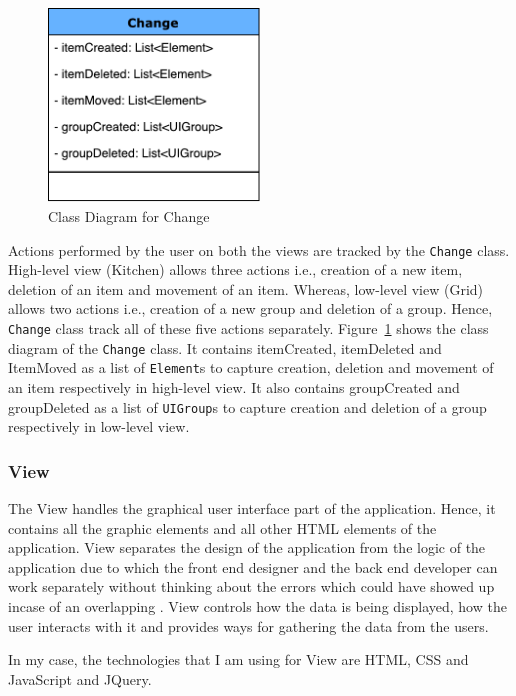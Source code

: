 \begin{figure}
	\includegraphics[width=0.5\textwidth]{figures/ClassDia_Change}
	\caption{Class Diagram for Change}
	\label{fig:ClassDia_Change}
\end{figure}

Actions performed by the user on both the views are tracked by the \texttt{Change} class. High-level view (Kitchen) allows three actions i.e., creation of a new item, deletion of an item and movement of an item. Whereas, low-level view (Grid) allows two actions i.e., creation of a new group and deletion of a group. Hence, \texttt{Change} class track all of these five actions separately. Figure~\ref{fig:ClassDia_Change} shows the class diagram of the \texttt{Change} class. It contains itemCreated, itemDeleted and ItemMoved as a list of \texttt{Element}s to capture creation, deletion and movement of an item respectively in high-level view. It also contains groupCreated and groupDeleted as a list of \texttt{UIGroup}s to capture creation and deletion of a group respectively in low-level view.

\subsubsection{View}\label{subsubsec:design_view}
The View handles the graphical user interface part of the application. Hence, it contains all the graphic elements and all other HTML elements of the application. View separates the design of the application from the logic of the application due to which the front end designer and the back end developer can work separately without thinking about the errors which could have showed up incase of an overlapping \cite{designpattern-headfirst} \cite{mvc-arch}. View controls how the data is being displayed, how the user interacts with it and provides ways for gathering the data from the users. 

In my case, the technologies that I am using for View are HTML, CSS and JavaScript and JQuery.

